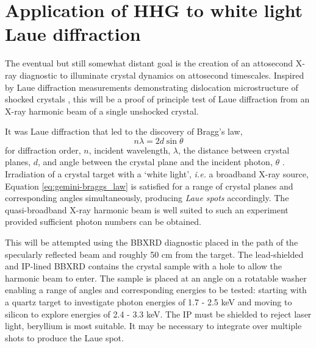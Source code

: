 
\section{Application of HHG to white light Laue diffraction}\label{sec:ch4-laue}
The eventual but still somewhat distant goal is the creation of an attosecond X-ray diagnostic to illuminate crystal dynamics on attosecond timescales. Inspired by Laue diffraction measurements demonstrating dislocation microstructure of shocked crystals \cite{suggitNanosecondWhitelightLaue2012}, this will be a proof of principle test of Laue diffraction from an X-ray harmonic beam of a single unshocked crystal.

It was Laue diffraction that led to the discovery of Bragg's law,
\begin{equation}\label{eq:gemini-braggs_law}
	n\lambda = 2d\sin\theta
\end{equation}
for diffraction order, $n$, incident wavelength, $\lambda$, the distance between crystal planes, $d$, and angle between the crystal plane and the incident photon, $\theta$ \cite{braggDiffractionWaves1915}. Irradiation of a crystal target with a `white light', \textit{i.e.} a broadband X-ray source, Equation \ref{eq:gemini-braggs_law} is satisfied for a range of crystal planes and corresponding angles simultaneously, producing \textit{Laue spots} accordingly. The quasi-broadband X-ray harmonic beam is well suited to such an experiment provided sufficient photon numbers can be obtained.

This will be attempted using the \ac{BBXRD} diagnostic placed in the path of the specularly reflected beam and roughly 50 cm from the target. The lead-shielded and IP-lined BBXRD contains the crystal sample with a hole to allow the harmonic beam to enter. The sample is placed at an angle on a rotatable washer enabling a range of angles and corresponding energies to be tested: starting with a quartz target to investigate photon energies of 1.7 - 2.5 keV and moving to silicon to explore energies of 2.4 - 3.3 keV. The IP must be shielded to reject laser light, beryllium is most suitable. It may be necessary to integrate over multiple shots to produce the Laue spot.

